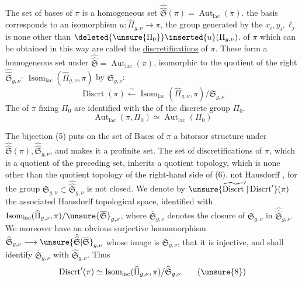 The set of bases of $\pi$ is a homogeneous set   $\widehat{\widehat{\mathfrak S}}(\pi)=\operatorname{Aut}_{\mathrm{lac}}(\pi)$.  the  basis corresponds to an isomorphism $u:\widehat{\Pi}_{g,\nu}\longrightarrow\pi$, the group  generated by the $x_i,y_i,\ell_j$ is none other than $\deleted{\unsure{\Pi_0}}\inserted{u}(\Pi_{g,\nu})$.   of $\pi$ which can be obtained in this way are called the \uline{discretifications} of $\pi$. These form a homogeneous set under $\widehat{\widehat{\mathfrak S}}=\operatorname{Aut}_{\mathrm{lac}}(\pi)$,  isomorphic to the quotient of the right $\widehat{\widehat{\mathfrak S}}_{g,\nu}$- $\operatorname{Isom}_{\mathrm{lac}}(\widehat{\Pi}_{g,\nu},\pi)$ by $\mathfrak S_{g,\nu}$:
\[
\operatorname{Discrt}(\pi) \xleftarrow{\sim} \operatorname{Isom}_{\mathrm{lac}}(\widehat{\Pi}_{g,\nu},\pi)/\mathfrak S_{g,\nu}
\tag{6}
\]
The   of $\pi$ fixing  $\Pi_0$ are identified with the  of the discrete group  $\Pi_0$.
\[
\operatorname{Aut}_{\mathrm{lac}}(\pi,\Pi_0)\simeq\operatorname{Aut}_{\mathrm{lac}}(\Pi_0)
\tag{7}
\]



The bijection (5) puts on the set of Bases of $\pi$ a bitorsor structure under $\widehat{\widehat{\mathfrak S}}(\pi),\widehat{\widehat{\mathfrak S}}_{g,\nu}$, and    makes it a profinite set. The set of discretifications of $\pi$, which is a quotient of the preceding set, inherits a quotient topology, which is none other than the quotient topology of the right-hand side of (6).   not Hausdorff , for the group $\mathfrak S_{g,\nu}\subset\widehat{\widehat{\mathfrak S}}_{g,\nu}$ is not closed. We denote by $\unsure{\widetilde{\operatorname{Discrt}}'|\operatorname{Discrt}'}(\pi)$ the associated Hausdorff topological space, identified with $\operatorname{Isom}_{\mathrm{lac}}(\widehat{\Pi}_{g,\nu},\pi)/\unsure{\overline{\mathfrak S}}_{g,\nu}$, where $\overline{\mathfrak S}_{g,\nu}$ denotes the closure of $\mathfrak S_{g,\nu}$ in $\widehat{\widehat{\mathfrak S}}_{g,\nu}$. We moreover have an obvious surjective homomorphism $\widehat{\mathfrak S}_{g,\nu}\longrightarrow\unsure{\widehat{\widehat{\mathfrak S}}|\overline{\mathfrak S}}_{g,\nu}$ whose image is $\overline{\mathfrak S}_{g,\nu}$,  that it is injective, and shall identify $\overline{\mathfrak S}_{g,\nu}$ with $\widehat{\mathfrak S}_{g,\nu}$. Thus
\[
\operatorname{Discrt}'(\pi)\simeq\operatorname{Isom}_{\mathrm{lac}}(\widehat{\Pi}_{g,\nu},\pi)/\widehat{\mathfrak S}_{g,\nu}
\tag{\unsure{8}}
\]

